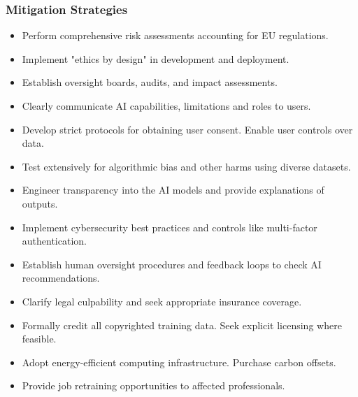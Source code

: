 \subsubsection{Mitigation Strategies}

\begin{itemize}
\item Perform comprehensive risk assessments accounting for EU regulations.

\item Implement "ethics by design" in development and deployment.

\item Establish oversight boards, audits, and impact assessments.

\item Clearly communicate AI capabilities, limitations and roles to users.

\item Develop strict protocols for obtaining user consent. Enable user controls over data.

\item Test extensively for algorithmic bias and other harms using diverse datasets.

\item Engineer transparency into the AI models and provide explanations of outputs.

\item Implement cybersecurity best practices and controls like multi-factor authentication.

\item Establish human oversight procedures and feedback loops to check AI recommendations.

\item Clarify legal culpability and seek appropriate insurance coverage.

\item Formally credit all copyrighted training data. Seek explicit licensing where feasible.

\item Adopt energy-efficient computing infrastructure. Purchase carbon offsets.

\item Provide job retraining opportunities to affected professionals.
\end{itemize}


